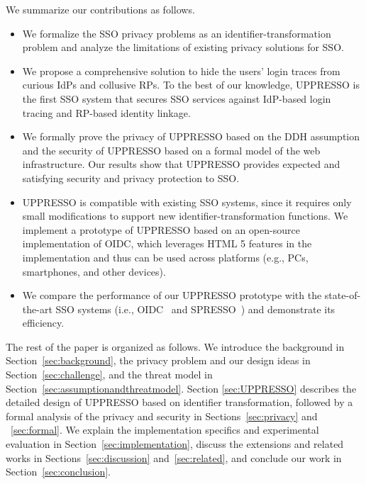 We summarize our contributions as follows.
\begin{itemize}
\vspace{-\topsep}
\item We formalize the SSO privacy problems as an identifier-transformation problem and analyze the limitations of existing privacy solutions for SSO. 
\vspace{-\topsep}
\item We propose a comprehensive solution to hide the users' login traces from curious IdPs and collusive RPs. To the best of our knowledge, UPPRESSO is the first SSO system that secures SSO services against IdP-based login tracing and RP-based identity linkage.
\vspace{-\topsep}
\item We formally prove the privacy of UPPRESSO based on the DDH assumption and the security of UPPRESSO based on a formal model of the web infrastructure. Our results show that UPPRESSO provides expected and satisfying security and privacy protection to SSO.
\vspace{-\topsep}
\item UPPRESSO is compatible with existing SSO systems, since it requires only small modifications to support new identifier-transformation functions. We implement a prototype of UPPRESSO based on an open-source implementation of OIDC, which leverages HTML 5 features in the implementation and thus can be used across platforms (e.g., PCs, smartphones, and other devices). %
\vspace{-\topsep}
\item We compare the performance of our UPPRESSO prototype with the state-of-the-art SSO systems (i.e., OIDC~\cite{OpenIDConnect} and SPRESSO~\cite{SPRESSO}) and demonstrate its efficiency.
\end{itemize}
\vspace{-\topsep}
The rest of the paper is organized as follows. We introduce the background in Section~\ref{sec:background}, the privacy problem and our design ideas in Section~\ref{sec:challenge}, and the threat model in Section~\ref{sec:assumptionandthreatmodel}. Section \ref{sec:UPPRESSO} describes the detailed design of UPPRESSO based on identifier transformation, followed by a formal analysis of the privacy and security in Sections~\ref{sec:privacy} and ~\ref{sec:formal}. We explain the implementation specifics and experimental evaluation in Section~\ref{sec:implementation}, discuss the extensions and related works in Sections~\ref{sec:discussion} and~\ref{sec:related}, and conclude our work in Section~\ref{sec:conclusion}.


